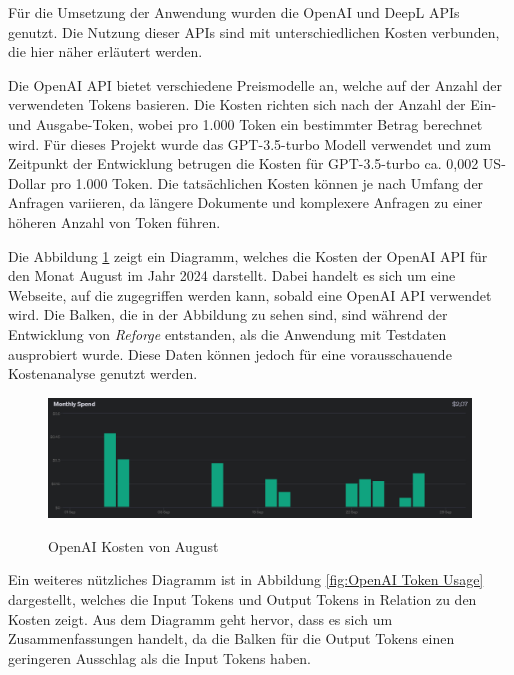 Für die Umsetzung der Anwendung wurden die OpenAI und DeepL \ac{API}s genutzt. Die Nutzung dieser \ac{API}s sind mit unterschiedlichen Kosten verbunden, die hier näher erläutert werden.

Die OpenAI \ac{API} bietet verschiedene Preismodelle an, welche auf der Anzahl der verwendeten Tokens basieren. Die Kosten richten sich nach der Anzahl der Ein- und Ausgabe-Token, wobei pro 1.000 Token ein bestimmter Betrag berechnet wird. Für dieses Projekt wurde das \ac{GPT}-3.5-turbo Modell verwendet und zum Zeitpunkt der Entwicklung betrugen die Kosten für \ac{GPT}-3.5-turbo ca. 0,002 US-Dollar pro 1.000 Token. Die tatsächlichen Kosten können je nach Umfang der Anfragen variieren, da längere Dokumente und komplexere Anfragen zu einer höheren Anzahl von Token führen.

Die Abbildung \ref{fig:OpenAI Kosten} zeigt ein Diagramm, welches die Kosten der OpenAI \ac{API} für den Monat August im Jahr 2024 darstellt. Dabei handelt es sich um eine Webseite, auf die zugegriffen werden kann, sobald eine OpenAI \ac{API} verwendet wird. Die Balken, die in der Abbildung zu sehen sind, sind während der Entwicklung von \textit{Reforge} entstanden, als die Anwendung mit Testdaten ausprobiert wurde. Diese Daten können jedoch für eine vorausschauende Kostenanalyse genutzt werden.

\begin{figure}[H]
\centering
\includegraphics[width=1\linewidth]{Images/MonthlySpend.png}\\
\caption{OpenAI Kosten von August}
\label{fig:OpenAI Kosten}
\end{figure}

Ein weiteres nützliches Diagramm ist in Abbildung \ref{fig:OpenAI Token Usage} dargestellt, welches die Input Tokens und Output Tokens in Relation zu den Kosten zeigt. Aus dem Diagramm geht hervor, dass es sich um Zusammenfassungen handelt, da die Balken für die Output Tokens einen geringeren Ausschlag als die Input Tokens haben. 

